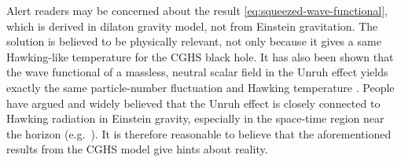 Alert readers may be concerned about the result 
\cref{eq:squeezed-wave-functional}, which is derived in dilaton gravity model, 
not from Einstein gravitation. The solution is believed to be physically 
relevant, not only because it gives a same Hawking-like temperature for the CGHS 
black hole. It has also been shown that the wave functional of a massless, 
neutral scalar field in the Unruh effect yields exactly the same particle-number 
fluctuation and Hawking temperature \cite{Freese1985,Kiefer2001}. People have 
argued and widely believed that the Unruh effect is closely connected to 
Hawking radiation in Einstein gravity, especially in the space-time region near 
the horizon (e.g.\ \cite{Susskind2004}). It is therefore reasonable to believe 
that the aforementioned results from the CGHS model give hints about reality.

